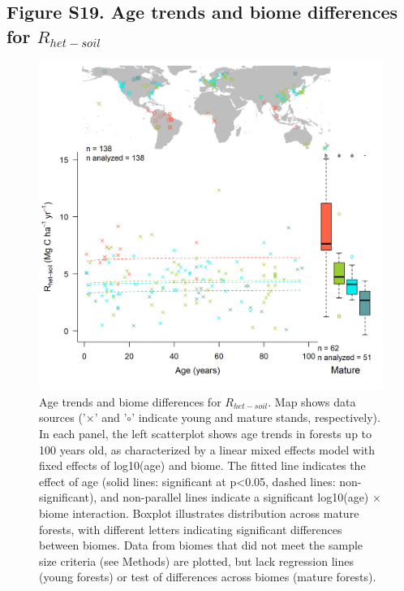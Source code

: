 \documentclass[
]{article}
\begin{document}
\newpage

\hypertarget{figure-s19.-age-trends-and-biome-differences-for-r_het-soil}{%
\subsection{\texorpdfstring{Figure S19. Age trends and biome differences
for
\(R_{het-soil}\)}{Figure S19. Age trends and biome differences for R\_\{het-soil\}}}\label{figure-s19.-age-trends-and-biome-differences-for-r_het-soil}}

\begin{figure}[H]

{\centering \includegraphics[width=1\linewidth]{tables_figures/age_trends/R_het_soil_with_map} 

}

\caption{Age trends and biome differences for $R_{het-soil}$. Map shows data sources ('$\times$' and '$\circ$' indicate young and mature stands, respectively). In each panel, the left scatterplot shows age trends in forests up to 100 years old, as characterized by a linear mixed effects model with fixed effects of log10(age) and biome. The fitted line indicates the effect of age (solid lines: significant at p<0.05, dashed lines: non-significant), and non-parallel lines indicate a significant log10(age) $\times$ biome interaction. Boxplot illustrates distribution across mature forests, with different letters indicating significant differences between biomes. Data from biomes that did not meet the sample size criteria (see Methods) are plotted, but lack regression lines (young forests) or test of differences across biomes (mature forests).}\label{fig:unnamed-chunk-22}
\end{figure}
\end{document}
